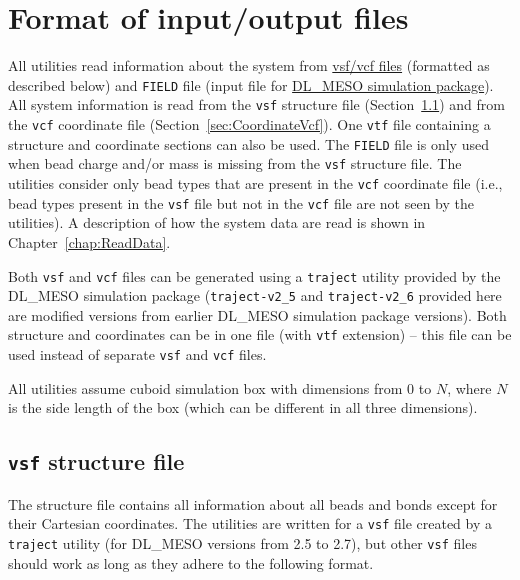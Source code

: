\chapter{Format of input/output files}\label{chap:input}

All utilities read information about the system from
\href{https://github.com/olenz/vtfplugin/wiki/VTF-format}{vsf/vcf files}
(formatted as described below) and \texttt{FIELD} file (input file for
\href{http://www.scd.stfc.ac.uk//research/app/ccg/software/DL_MESO/40694.aspx}{DL\_MESO
simulation package}).
All system information is read from the \texttt{vsf} structure file
(Section~\ref{sec:StructureVsf}) and from the \texttt{vcf} coordinate file
(Section~\ref{sec:CoordinateVcf}). One \texttt{vtf} file containing a
structure and coordinate sections can also be used.
The \texttt{FIELD} file is only used when bead charge
and/or mass is missing from the \texttt{vsf} structure file.
The utilities consider only bead types that are present in the \texttt{vcf}
coordinate file (i.e., bead types present in the \texttt{vsf} file but not
in the \texttt{vcf} file are not seen by the utilities). A description of
how the system data are read is shown in Chapter~\ref{chap:ReadData}.

Both \texttt{vsf} and \texttt{vcf} files can be generated using a
\texttt{traject} utility provided by the DL\_MESO simulation package
(\texttt{traject-v2\_5} and \texttt{traject-v2\_6} provided here are
modified versions from earlier DL\_MESO simulation package versions).  Both
structure and coordinates can be in one file (with \texttt{vtf} extension)
-- this file can be used instead of separate \texttt{vsf} and
\texttt{vcf} files.

All utilities assume cuboid simulation box with dimensions from 0 to $N$,
where $N$ is the side length of the box (which can be different in all
three dimensions).

\section{\texttt{vsf} structure file} \label{sec:StructureVsf} %

The structure file contains all information about all beads and bonds
except for their Cartesian coordinates. The utilities are written for a
\texttt{vsf} file created by a \texttt{traject} utility (for DL\_MESO
versions from 2.5 to 2.7), but other \texttt{vsf} files should work as long
as they adhere to the following format.

